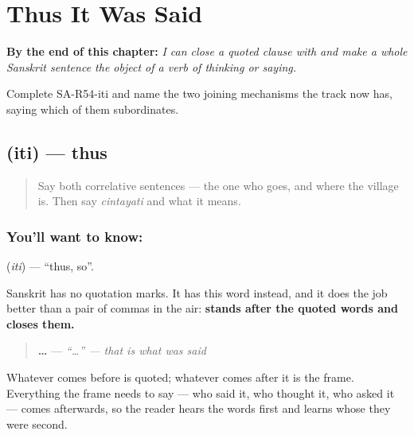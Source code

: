 
\chapter{Thus It Was Said}
\label{ch:sa-thus-it-was-said}

\begin{chapteropening}
\textbf{By the end of this chapter:} \emph{I can close a quoted clause with  and make a whole Sanskrit sentence the object of a verb of thinking or saying.}

Complete SA-R54-iti and name the two joining mechanisms the track now has, saying which of them subordinates.
\end{chapteropening}

\section[\texorpdfstring{\sk{इति} (iti)}{इति (iti)}]{ (iti) — thus}

\label{lesson:SA-C54-iti}



\begin{quote}
Say both correlative sentences — the one who goes, and where the village is. Then say \emph{cintayati} and what it means.
\end{quote}

\subsection*{You'll want to know: }
\textbf{} (\emph{iti}) — \textquotedblleft{}thus, so\textquotedblright{}.

Sanskrit has no quotation marks. It has this word instead, and it does the job better than a pair of commas in the air: \textbf{ stands after the quoted words and closes them.}

\begin{quote}
\textbf{… } — \emph{\textquotedblleft{}…\textquotedblright{} — that is what was said}
\end{quote}

Whatever comes before \textbf{} is quoted; whatever comes after it is the frame. Everything the frame needs to say — who said it, who thought it, who asked it — comes afterwards, so the reader hears the words first and learns whose they were second.


